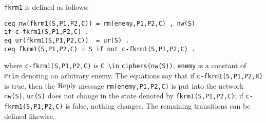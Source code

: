 \documentclass[a4paper,fleqn]{cas-dc}
\begin{document}
\verb!fkrm1! is defined as follows:
\begin{small}
\begin{verbatim}
ceq nw(fkrm1(S,P1,P2,C)) = rm(enemy,P1,P2,C) , nw(S) 
if c-fkrm1(S,P1,P2,C) .
eq ur(fkrm1(S,P1,P2,C))  = ur(S) .
ceq fkrm1(S,P1,P2,C) = S if not c-fkrm1(S,P1,P2,C) .
\end{verbatim}
\end{small}
	
	\noindent
	where \verb!c-fkrm1(S,P1,P2,C)! is \verb!C \in! \verb!ciphers(nw(S))!, 
	\verb!enemy! is a constant of \verb!Prin! denoting an arbitrary enemy.
	The equations say that if \verb!c-fkrm1(S,P1,P2,R)! is true, then the $\rm Reply$ message \verb!rm(enemy,P1,P2,C)! is put into the network \verb!nw(S)!, \verb!ur(S)! does not change in the state denoted by \verb!fkrm1(S,P1,P2,C)!; if \verb!c-fkrm1(S,P1,P2,C)! is false, nothing changes. 
	The remaining transitions can be defined likewise.
\end{document}
